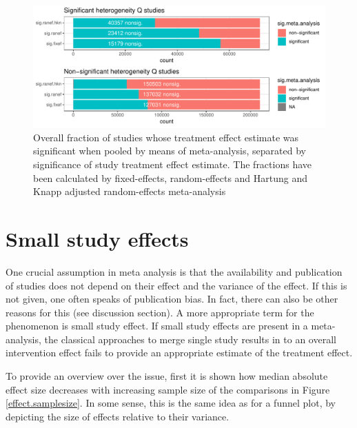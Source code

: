 \documentclass[11pt,a4paper,twoside]{book}\usepackage[]{graphicx}\usepackage[]{color}
\newenvironment{knitrout}{}{} %
\begin{document}
\begin{figure}
\begin{knitrout}
\color{fgcolor}

{\centering \includegraphics[width=\textwidth-3cm]{figure/ch02_figunnamed-chunk-16-1} 

}



\end{knitrout}
\caption{Overall fraction of studies whose treatment effect estimate was significant when pooled by means of meta-analysis, separated by significance of study treatment effect estimate. The fractions have been calculated
by fixed-effects, random-effects and Hartung and Knapp adjusted random-effects meta-analysis}
\label{primary.secondary.significance.sep.sig}
\end{figure}


\section{Small study effects}
One crucial assumption in meta analysis is that the availability and publication of studies does not depend on their effect and the variance of the effect. If this is not given, one often speaks of publication bias. In fact, there can also be other reasons for this (see discussion section). A more appropriate term for the phenomenon is small study effect. If small study effects are present in a meta-analysis, the classical approaches to merge single study results in to an overall intervention effect fails to provide an appropriate estimate of the treatment effect. 

\vspace{0mm}
To provide an overview over the issue, first it is shown how median absolute effect size decreases with increasing sample size of the comparisons in Figure \ref{effect.samplesize}. In some sense, this is the same idea as for a funnel plot, by depicting the size of effects relative to their variance. 
\end{document}
